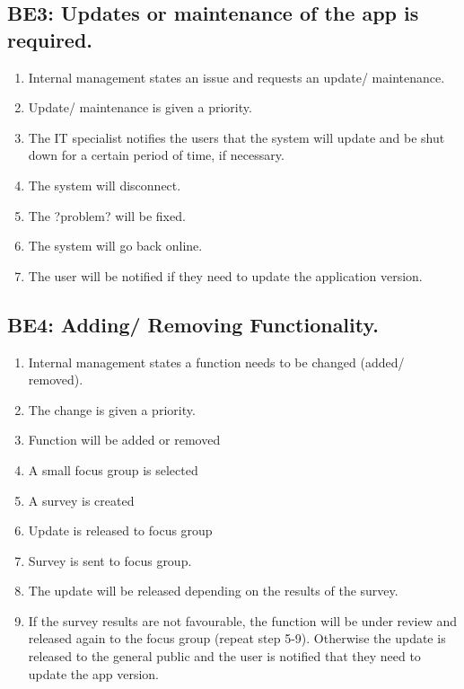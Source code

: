 \documentclass[]{article}
\begin{document}
\subsection{BE3: Updates or maintenance of the app is required.}
\label{sub: BE3:  Updates or maintenance of the app is required.}
\begin{enumerate}[{BE3}.1]
	\item Internal management states an issue and requests an update/ maintenance.
	\item Update/ maintenance is given a priority.
	\item The IT specialist notifies the users that the system will update and be shut down for a certain period of time, if necessary.
	\item The system will disconnect.
	\item The ?problem? will be fixed.
	\item The system will go back online.
	\item The user will be notified if they need to update the application version.
\end{enumerate}


\subsection{BE4: Adding/ Removing Functionality.}
\label{sub: BE4:  Adding/ Removing Functionality.}
\begin{enumerate}[{BE4}.1]
	\item  Internal management states a function needs to be changed (added/ removed).
	\item The change is given a priority.
	\item Function will be added or removed
	\item A small focus group is selected 
	\item A survey is created
	\item Update is released to focus group
	\item Survey is sent to focus group.
	\item The update will be released depending on the results of the survey.
	\item If the survey results are not favourable, the function will be under review and released again to the focus group (repeat step 5-9). Otherwise the update is released to the general public and the user is notified that they need to update the app version. 
\end{enumerate}
\end{document}
